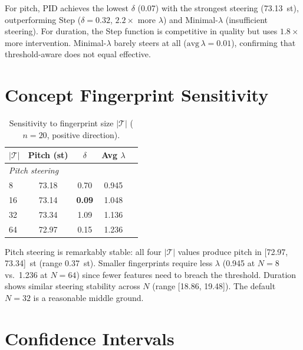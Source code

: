 \documentclass{article}
\theoremstyle{plain}
\begin{document}
For pitch, PID achieves the lowest $\delta$ (0.07) with the strongest steering (73.13~st), outperforming Step ($\delta{=}0.32$, $2.2{\times}$ more $\lambda$) and Minimal-$\lambda$ (insufficient steering). For duration, the Step function is competitive in quality but uses $1.8{\times}$ more intervention. Minimal-$\lambda$ barely steers at all ($\text{avg}\,\lambda{=}0.01$), confirming that threshold-aware does not equal effective.

\section{Concept Fingerprint Sensitivity}
\label{app:fingerprint}

\begin{table}[h]
  \caption{Sensitivity to fingerprint size $|\mathcal{T}|$ ($n{=}20$, positive direction).}
  \label{tab:fingerprint}
  \begin{center}
  \begin{small}
  \begin{tabular}{lcccc}
    \toprule
    $|\mathcal{T}|$ & Pitch (st) & $\delta$ & Avg $\lambda$ \\
    \midrule
    \multicolumn{4}{l}{\textit{Pitch steering}} \\
    8 & 73.18 & 0.70 & 0.945 \\
    16 & 73.14 & \textbf{0.09} & 1.048 \\
    32 & 73.34 & 1.09 & 1.136 \\
    64 & 72.97 & 0.15 & 1.236 \\
    \bottomrule
  \end{tabular}
  \end{small}
  \end{center}
\end{table}

Pitch steering is remarkably stable: all four $|\mathcal{T}|$ values produce pitch in [72.97, 73.34]~st (range 0.37~st). Smaller fingerprints require less $\lambda$ (0.945 at $N{=}8$ vs.\ 1.236 at $N{=}64$) since fewer features need to breach the threshold. Duration shows similar steering stability across $N$ (range [18.86, 19.48]). The default $N{=}32$ is a reasonable middle ground.

\section{Confidence Intervals}
\label{app:confidence_intervals}
\end{document}
